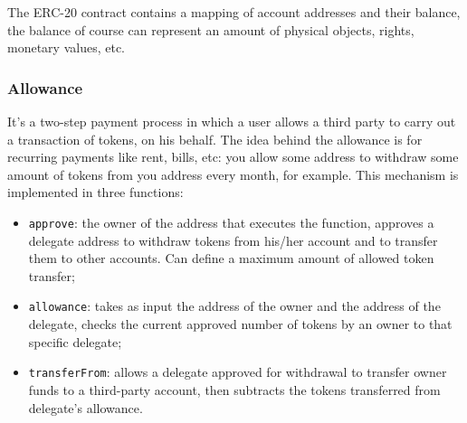 The ERC-20 contract contains a mapping of account addresses and their balance, the balance of course can represent an amount of physical objects, rights, monetary values, etc.

\subsubsection{Allowance}
It's a two-step payment process in which a user allows a third party to carry out a transaction of tokens, on his behalf.
The idea behind the allowance is for recurring payments like rent, bills, etc: you allow some address to withdraw some amount of tokens from you address every month, for example.
This mechanism is implemented in three functions:
\begin{itemize}
    \item \verb|approve|: the owner of the address that executes the function, approves a delegate address to withdraw tokens from his/her account and to transfer them to other accounts.
    Can define a maximum amount of allowed token transfer;

    \item \verb|allowance|: takes as input the address of the owner and the address of the delegate, checks the current approved number of tokens by an owner to that specific delegate;

    \item \verb|transferFrom|: allows a delegate approved for withdrawal to transfer owner funds to a third-party account, then subtracts the tokens transferred from delegate's allowance.
\end{itemize}



